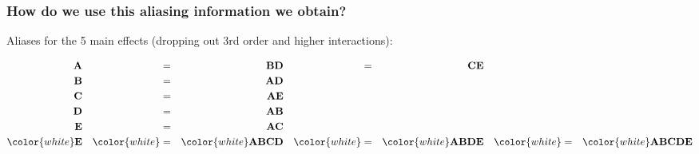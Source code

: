 \begin{frame}\frametitle{How do we use this aliasing information we obtain?}
	
	\vspace{1cm}
	Aliases for the 5 main effects (dropping out 3rd order and higher interactions):
	
	\vspace{0.5cm}
	\begin{align*}
		\textbf{A} &&=&& \textbf{BD} &&=&& \textbf{CE} \\
		\textbf{B} &&=&& \textbf{AD} &&&& &&&& \\
		\textbf{C} &&=&& \textbf{AE} &&&& &&&& \\
		\textbf{D} &&=&& \textbf{AB} &&&& &&&& \\
		\textbf{E} &&=&& \textbf{AC} &&&& &&&& \\
		\color{white}  \textbf{E} &&\color{white}=&& \color{white} \textbf{ABCD}	 &&\color{white}=&& \color{white} \textbf{ABDE}	&&\color{white}=&& \color{white} \textbf{ABCDE}
	\end{align*}
		
	
\end{frame}

